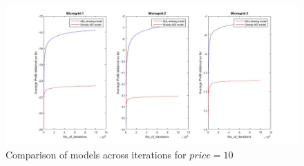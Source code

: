 \begin{figure}[thbp] \label{r1}
	\centering
	\includegraphics[scale = 0.2]{second_plot.jpg}
	\caption{Comparison of models across iterations for $price = 10$  }
\end{figure}


